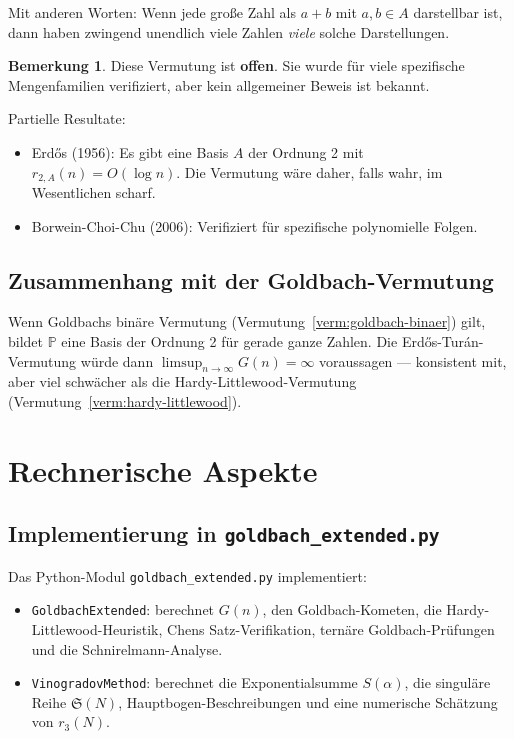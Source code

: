 \documentclass[12pt,a4paper]{amsart}
\theoremstyle{definition}
\newtheorem{bemerkung}[theorem]{Bemerkung}
\begin{document}
Mit anderen Worten: Wenn jede gro\ss{}e Zahl als $a + b$ mit $a, b \in A$
darstellbar ist, dann haben zwingend unendlich viele Zahlen \emph{viele}
solche Darstellungen.

\begin{bemerkung}
Diese Vermutung ist \textbf{offen}.  Sie wurde f\"{u}r viele spezifische
Mengenfamilien verifiziert, aber kein allgemeiner Beweis ist bekannt.

Partielle Resultate:
\begin{itemize}
\item Erd\H{o}s (1956): Es gibt eine Basis $A$ der Ordnung 2 mit
      $r_{2,A}(n) = O(\log n)$.  Die Vermutung w\"{a}re daher, falls
      wahr, im Wesentlichen scharf.
\item Borwein-Choi-Chu (2006): Verifiziert f\"{u}r spezifische
      polynomielle Folgen.
\end{itemize}
\end{bemerkung}

\subsection{Zusammenhang mit der Goldbach-Vermutung}

Wenn Goldbachs bin\"{a}re Vermutung (Vermutung~\ref{verm:goldbach-binaer})
gilt, bildet $\mathbb{P}$ eine Basis der Ordnung 2 f\"{u}r gerade
ganze Zahlen.  Die Erd\H{o}s-Tur\'{a}n-Vermutung w\"{u}rde dann
$\limsup_{n \to \infty} G(n) = \infty$ voraussagen --- konsistent mit,
aber viel schw\"{a}cher als die Hardy-Littlewood-Vermutung
(Vermutung~\ref{verm:hardy-littlewood}).

\section{Rechnerische Aspekte}\label{sec:rechnerisch}

\subsection{Implementierung in \texttt{goldbach\_extended.py}}

Das Python-Modul \texttt{goldbach\_extended.py} implementiert:
\begin{itemize}
\item \texttt{GoldbachExtended}: berechnet $G(n)$, den Goldbach-Kometen,
      die Hardy-Littlewood-Heuristik, Chens Satz-Verifikation,
      tern\"{a}re Goldbach-Pr\"{u}fungen und die Schnirelmann-Analyse.
\item \texttt{VinogradovMethod}: berechnet die Exponentialsumme $S(\alpha)$,
      die singuläre Reihe $\mathfrak{S}(N)$, Hauptbogen-Beschreibungen
      und eine numerische Sch\"{a}tzung von $r_3(N)$.
\end{itemize}
\end{document}
